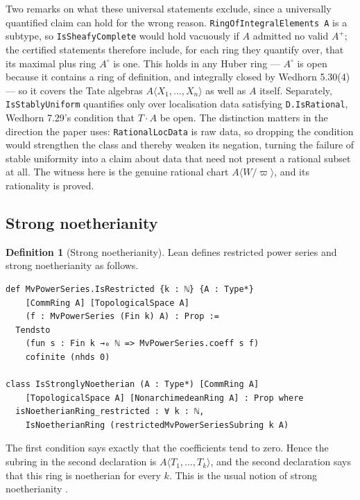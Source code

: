\documentclass[11pt,reqno]{amsart}
\theoremstyle{definition}
\newtheorem{definition}[definition]{Definition}
\begin{document}
Two remarks on what these universal statements exclude, since a universally quantified
claim can hold for the wrong reason.  \texttt{RingOfIntegralElements A} is a subtype, so
\texttt{IsSheafyComplete} would hold vacuously if \(A\) admitted no valid \(A^+\); the
certified statements therefore include, for each ring they quantify over, that its maximal
plus ring \(A^\circ\) is one.  This holds in any Huber ring --- \(A^\circ\) is open
because it contains a ring of definition, and integrally closed by Wedhorn 5.30(4) --- so it
covers the Tate algebras \(A\langle X_1,\ldots,X_n\rangle\) as well as \(A\) itself.
Separately, \texttt{IsStablyUniform} quantifies only over localisation data satisfying
\texttt{D.IsRational}, Wedhorn 7.29's condition that \(T\cdot A\) be open.  The
distinction matters in the direction the paper uses: \texttt{RationalLocData} is raw data,
so dropping the condition would strengthen the class and thereby weaken its negation,
turning the failure of stable uniformity into a claim about data that need not present a
rational subset at all.  The witness here is the genuine rational chart
\(A\langle W/\varpi\rangle\), and its rationality is proved.

\subsection{Strong noetherianity}

\begin{definition}[Strong noetherianity]
\label{def:lean-strong-noetherianity}
Lean defines restricted power series and strong noetherianity as follows.

\newpage\begin{lstlisting}
def MvPowerSeries.IsRestricted {k : ℕ} {A : Type*}
    [CommRing A] [TopologicalSpace A]
    (f : MvPowerSeries (Fin k) A) : Prop :=
  Tendsto
    (fun s : Fin k →₀ ℕ => MvPowerSeries.coeff s f)
    cofinite (nhds 0)

class IsStronglyNoetherian (A : Type*) [CommRing A]
    [TopologicalSpace A] [NonarchimedeanRing A] : Prop where
  isNoetherianRing_restricted : ∀ k : ℕ,
    IsNoetherianRing (restrictedMvPowerSeriesSubring k A)
\end{lstlisting}

The first condition says exactly that the coefficients tend to zero.  Hence
the subring in the second declaration is
\(A\langle T_1,\ldots,T_k\rangle\), and the second declaration says that this
ring is noetherian for every \(k\).  This is the usual notion of strong
noetherianity \cite[Proposition and Definition~6.36]{Wedhorn}.
\end{definition}
\end{document}
